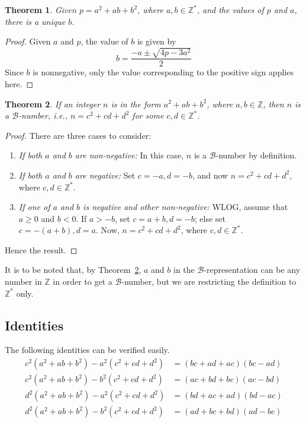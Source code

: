 \documentclass[reqno]{amsart}
\newtheorem{theorem}{Theorem}
\newcommand{\bnum}   {\ensuremath{\mathcal B}-number}
\newcommand{\brep}   {\ensuremath{\mathcal B}-representation}
\newcommand{\bq}[2]{\ensuremath{{#1}^2 + {#1}{#2} + {#2}^2}}
\newcommand{\bqab}{\bq{a}{b}}
\newcommand{\bqcd}{\bq{c}{d}}
\newcommand{\Integer}{\ensuremath{\mathbb{Z}}}
\newcommand{\Nonnegative}{\ensuremath{\mathbb{Z^*}}}
\begin{document}
\begin{theorem}
  \label{th:UniqueB}
  Given $p=\bqab$, where $a,b \in \Nonnegative$, and the
  values of $p$ and $a$, there is a unique $b$.
\end{theorem}
\begin{proof}
  Given $a$ and $p$, the value of $b$ is given by 
  \begin{equation*}
    b = \frac{-a \pm \sqrt{4p-3a^2}}{2}
  \end{equation*}
Since $b$ is nonnegative, only the value corresponding to
the positive sign applies here.
\end{proof}
\begin{theorem}
  \label{th:BNumOfAllIntegers}
  If an integer $n$ is in the form \bqab{}, where
  $a,b \in \Integer$, then $n$ is a \bnum{}, i.e.,
  $n=\bqcd$ for some $c, d \in \Nonnegative$.
\end{theorem}
\begin{proof}
  There are three cases to consider:
  \begin{enumerate}
  \item {\em If both $a$ and $b$ are non-negative:} In this case,
    $n$ is a \bnum{} by definition.
  \item {\em If both $a$ and $b$ are negative:} Set $c = -a, d =
    -b$, and now $n = \bqcd$, where $c,d \in \Nonnegative$.
  \item {\em If one of $a$ and $b$ is negative and other
      non-negative:} WLOG, assume that $a \ge 0$ and $b < 0$.  If
    $a > -b$, set $c = a+b, d=-b$; else set $c = -(a+b),
    d=a$. Now, $n = \bqcd$, where $c,d \in \Nonnegative$.
  \end{enumerate}
  Hence the result.
\end{proof}

It is to be noted that, by Theorem~\ref{th:BNumOfAllIntegers}, $a$ and $b$ in the
\brep{} can be any number in \Integer{} in order to get a
\bnum{}, but we are restricting the definition to
\Nonnegative{} only.

\subsection{Identities}

The following identities can be
verified easily.
\begin{subequations}
  \begin{align}
    c^2(\bqab) - a^2(\bqcd) &= (bc+ad+ac)(bc-ad) \label{eq:Id1}\\
    c^2(\bqab) - b^2(\bqcd) &= (ac+bd+bc)(ac-bd) \label{eq:Id2}\\
    d^2(\bqab) - a^2(\bqcd) &= (bd+ac+ad)(bd-ac) \label{eq:Id3}\\
    d^2(\bqab) - b^2(\bqcd) &= (ad+bc+bd)(ad-bc) \label{eq:Id4}
  \end{align}
\end{subequations}
\end{document}
